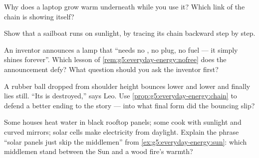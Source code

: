 \begin{exercise}[$\star$]\label{exo:g5:everyday-energy:7}
Why does a laptop grow warm underneath while you use it? Which link
of the chain is showing itself?
\end{exercise}

\begin{exercise}[$\star$]\label{exo:g5:everyday-energy:8}
Show that a sailboat runs on sunlight, by tracing its chain
backward step by step.
\end{exercise}

\begin{exercise}[$\star\star$]\label{exo:g5:everyday-energy:9}
An inventor announces a lamp that ``needs no , no plug, no
fuel --- it simply shines forever''. Which lesson of
\cref{rem:g5:everyday-energy:nofree} does the announcement defy?
What question should you ask the inventor first?
\end{exercise}

\begin{exercise}[$\star\star$]\label{exo:g5:everyday-energy:10}
A rubber ball dropped from shoulder height bounces lower and lower
and finally lies still. ``Its  is destroyed,'' says Leo. Use
\cref{prop:g5:everyday-energy:chain} to defend a better ending to
the story --- into what final form did the bouncing 
slip?
\end{exercise}

\begin{exercise}[$\star\star$]\label{exo:g5:everyday-energy:11}
Some houses heat water in black rooftop panels; some cook with
sunlight and curved mirrors; solar cells make electricity from
daylight. Explain the phrase ``solar panels just skip the
middlemen'' from \cref{ex:g5:everyday-energy:sun}: which middlemen
stand between the Sun and a wood fire's warmth?
\end{exercise}

